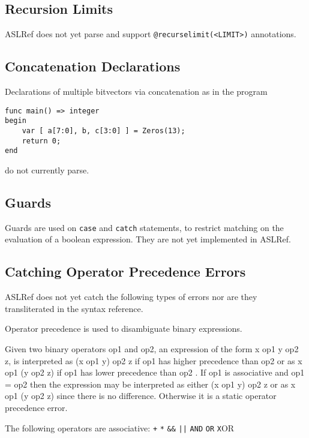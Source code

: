\documentclass{book}
\begin{document}
\subsection{Recursion Limits}
ASLRef does not yet parse and support \texttt{@recurselimit(<LIMIT>)} annotations.

\subsection{Concatenation Declarations}
Declarations of multiple bitvectors via concatenation as in the program
\begin{Verbatim}
func main() => integer
begin
    var [ a[7:0], b, c[3:0] ] = Zeros(13);
    return 0;
end
\end{Verbatim}
do not currently parse.


\subsection{Guards}

Guards are used on \texttt{case} and \texttt{catch} statements, to restrict
matching on the evaluation of a boolean expression.
%
They are not yet implemented in ASLRef.


\subsection{Catching Operator Precedence Errors}
ASLRef does not yet catch the following types of errors nor are they transliterated in the syntax reference.

Operator precedence is used to disambiguate binary expressions.

Given two binary operators op1 and op2, an expression of the form x op1 y op2 z, is interpreted as (x op1 y) op2 z
if op1 has higher precedence than op2 or as x op1 (y op2 z) if op1 has lower precedence than op2 . If op1 is
associative and op1 = op2 then the expression may be interpreted as either (x op1 y) op2 z or as x op1 (y op2 z)
since there is no difference. Otherwise it is a static operator precedence error.

The following operators are associative: \texttt{+} \texttt{*} \texttt{\&\&} \texttt{||} \texttt{AND} \texttt{OR} \texttt{X}OR
\end{document}
